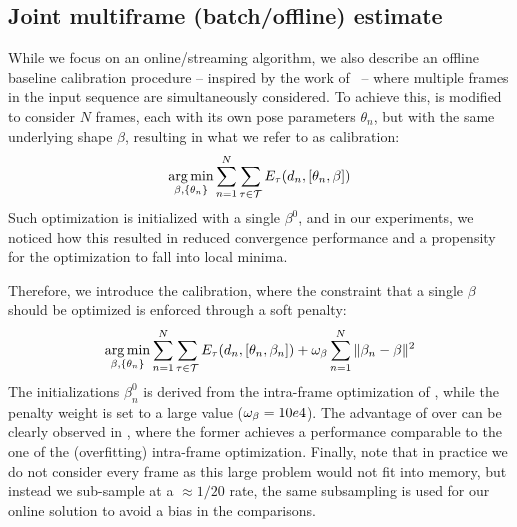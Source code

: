 

\subsection{Joint multiframe (batch/offline) estimate}
\label{sec:batch}
\label{sec:offline}
While we focus on an online/streaming algorithm, we also describe an offline baseline calibration procedure -- inspired by the work of~\cite{taylor2014user} -- where multiple frames in the input sequence are simultaneously considered. To achieve this,  is modified to consider $N$ frames, each with its own pose parameters $\theta_n$, but with the same underlying shape $\beta$, resulting in what we refer to as \emph{\OfflineHard{}} calibration:
% 
\begin{equation}
\operatorname*{arg\,min}_{\beta, \{\theta_n\} } \sum_{n=1}^N \sum_{\tau \in \mathcal{T}} E_{\tau}(d_n, [\theta_n, \beta]) 
\label{eq:offlinehard}
\end{equation}
% 
Such optimization is initialized with a single $\beta^0$, and in our experiments, we noticed how this resulted in reduced convergence performance and a propensity for the optimization to fall into local minima. 

Therefore, we introduce the \emph{\OfflineSoft{}} calibration, where the constraint that a single $\beta$ should be optimized is enforced through a soft penalty:
% 
\begin{equation}
\operatorname*{arg\,min}_{\beta, \{\theta_n\} } \sum_{n=1}^N \sum_{\tau \in \mathcal{T}} E_{\tau}(d_n, [\theta_n, \beta_n]) + \omega_{\beta} \sum_{n=1}^N \| \beta_n - \beta \|^2
\label{eq:offlinesoft}
\end{equation}
%
The initializations $\beta_n^0$ is derived from the intra-frame optimization of , while the penalty weight is set to a large value ($\small \omega_{\beta}=10e4$). The advantage of \OfflineSoft{} over \OfflineHard{} can be clearly observed in , where the former achieves a performance comparable to the one of the (overfitting) intra-frame optimization. Finally, note that in practice we do not consider every frame as this large problem would not fit into memory, but instead we sub-sample at a $\approx 1/20$ rate, the same subsampling is used for our online solution to avoid a bias in the comparisons. 

